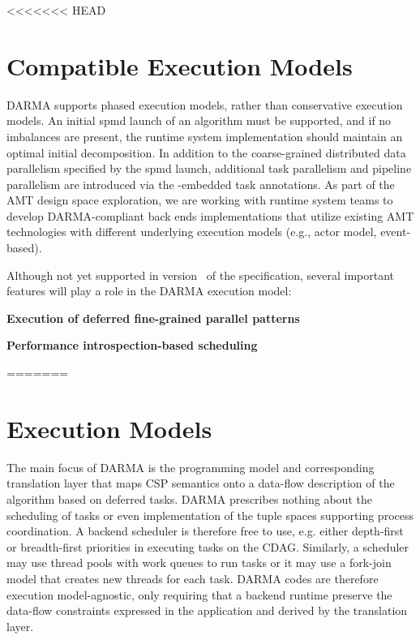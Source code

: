
<<<<<<< HEAD
\section{Compatible Execution Models}
\label{sec:execmodel}
\gls{DARMA} supports \gls{phased execution} models, rather than \gls{conservative
execution} models.  
An initial \gls{spmd} launch of an algorithm must be supported, and if
no imbalances are present, the \gls{runtime system} implementation should
maintain an optimal initial decomposition. In addition to the coarse-grained distributed
\gls{data parallelism} specified by the \gls{spmd} launch, additional \gls{task
parallelism} and \gls{pipeline parallelism} are introduced via the \CC-embedded task annotations.
As part of the \gls{AMT} design space exploration, we are working with
\gls{runtime system} teams to develop \gls{DARMA}-compliant \glspl{back end}
implementations that utilize existing \gls{AMT} technologies with different
underlying \glspl{execution model} (e.g., \gls{actor model}, \gls{event-based}).  


Although not yet supported in version \specVersion\ of the specification, several
important features will play a role in the DARMA \gls{execution model}:

\begin{compactdesc}
\item{\bf Execution of deferred fine-grained parallel patterns}
\item{\bf Performance introspection-based scheduling}
\end{compactdesc}

=======
\section{Execution Models}
\label{sec:exec_model}

The main focus of DARMA is the programming model and corresponding translation layer that maps CSP semantics onto a data-flow description of the algorithm based on deferred tasks.
DARMA prescribes nothing about the scheduling of tasks or even implementation of the tuple spaces supporting process coordination.
A backend scheduler is therefore free to use, e.g. either depth-first or breadth-first priorities in executing tasks on the CDAG.
Similarly, a scheduler may use thread pools with work queues to run tasks or it may use a fork-join model that creates new threads for each task.
DARMA codes are therefore execution model-agnostic, only requiring that a backend runtime preserve the data-flow constraints expressed in the application and derived by the translation layer.

